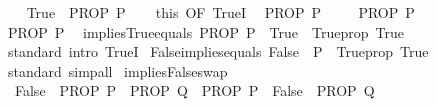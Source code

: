\begin{isabellebody}
%
\isadelimproof
%
\endisadelimproof
%
\isatagproof
{}\isamarkupfalse%
\isanewline
\ \ \isamarkupfalse%
\ {\isachardoublequoteopen}True\ {\isasymLongrightarrow}\ PROP\ P{\isachardoublequoteclose}\isanewline
\ \ \isamarkupfalse%
\ this\ {\isacharbrackleft}{\kern0pt}OF\ TrueI{\isacharbrackright}{\kern0pt}\ \isamarkupfalse%
\ {\isachardoublequoteopen}PROP\ P{\isachardoublequoteclose}\ \isacommand{{\isachardot}{\kern0pt}}\isamarkupfalse%
\isanewline
{}\isamarkupfalse%
\isanewline
\ \ \isamarkupfalse%
\ {\isachardoublequoteopen}PROP\ P{\isachardoublequoteclose}\isanewline
\ \ \isamarkupfalse%
\ \isamarkupfalse%
\ {\isachardoublequoteopen}PROP\ P{\isachardoublequoteclose}\ \isacommand{{\isachardot}{\kern0pt}}\isamarkupfalse%
\isanewline
{}\isamarkupfalse%
%
\endisatagproof
{\isafoldproof}%
%
\isadelimproof
\isanewline
%
\endisadelimproof
\isanewline
{}\isamarkupfalse%
\ implies{\isacharunderscore}{\kern0pt}True{\isacharunderscore}{\kern0pt}equals{\isacharcolon}{\kern0pt}\ {\isachardoublequoteopen}{\isacharparenleft}{\kern0pt}PROP\ P\ {\isasymLongrightarrow}\ True{\isacharparenright}{\kern0pt}\ {\isasymequiv}\ Trueprop\ True{\isachardoublequoteclose}\isanewline
%
\isadelimproof
\ \ %
\endisadelimproof
%
\isatagproof
{}\isamarkupfalse%
\ standard\ {\isacharparenleft}{\kern0pt}intro\ TrueI{\isacharparenright}{\kern0pt}%
\endisatagproof
{\isafoldproof}%
%
\isadelimproof
\isanewline
%
\endisadelimproof
\isanewline
{}\isamarkupfalse%
\ False{\isacharunderscore}{\kern0pt}implies{\isacharunderscore}{\kern0pt}equals{\isacharcolon}{\kern0pt}\ {\isachardoublequoteopen}{\isacharparenleft}{\kern0pt}False\ {\isasymLongrightarrow}\ P{\isacharparenright}{\kern0pt}\ {\isasymequiv}\ Trueprop\ True{\isachardoublequoteclose}\isanewline
%
\isadelimproof
\ \ %
\endisadelimproof
%
\isatagproof
{}\isamarkupfalse%
\ standard\ simp{\isacharunderscore}{\kern0pt}all%
\endisatagproof
{\isafoldproof}%
%
\isadelimproof
\isanewline
%
\endisadelimproof
\isanewline
\isanewline
{}\isamarkupfalse%
\ implies{\isacharunderscore}{\kern0pt}False{\isacharunderscore}{\kern0pt}swap{\isacharcolon}{\kern0pt}\isanewline
\ \ {\isachardoublequoteopen}{\isacharparenleft}{\kern0pt}False\ {\isasymLongrightarrow}\ PROP\ P\ {\isasymLongrightarrow}\ PROP\ Q{\isacharparenright}{\kern0pt}\ {\isasymequiv}\ {\isacharparenleft}{\kern0pt}PROP\ P\ {\isasymLongrightarrow}\ False\ {\isasymLongrightarrow}\ PROP\ Q{\isacharparenright}{\kern0pt}{\isachardoublequoteclose}\isanewline

\end{isabellebody}
